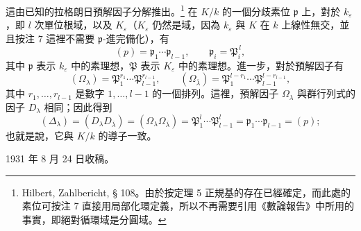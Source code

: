 \documentclass[11pt]{article}
\newcommand{\frakp}{\mathfrak p}
\newcommand{\frakP}{\mathfrak P}
\begin{document}
這由已知的拉格朗日預解因子分解推出。\footnote{Hilbert, Zahlbericht, § 108。由於按定理 5 正規基的存在已經確定，而此處的素位可按注 7 直接用局部化環定義，所以不再需要引用《數論報告》中所用的事實，即絕對循環域是分圓域。} 在 \(K/k\) 的一個分歧素位 \(\frakp\) 上，對於 \(k_\varepsilon\)，即 \(l\) 次單位根域，以及 \(K_\varepsilon\)（\(K_\varepsilon\) 仍然是域，因為 \(k_\varepsilon\) 與 \(K\) 在 \(k\) 上線性無交，並且按注 7 這裡不需要 \(\frakp\)-進完備化），有
\[
        (p)=\frakp_1\cdots\frakp_{l-1},
        \qquad
        \frakp_i=\frakP_i^{\,l},
\]
其中 \(\frakp\) 表示 \(k_\varepsilon\) 中的素理想，\(\frakP\) 表示 \(K_\varepsilon\) 中的素理想。進一步，對於預解因子有
\[
        (\Omega_\lambda)=\frakP_1^{r_1}\cdots\frakP_{l-1}^{r_{l-1}},
        \qquad
        (\Omega_{\bar\lambda})=
        \frakP_1^{l-r_1}\cdots\frakP_{l-1}^{l-r_{l-1}},
\]
其中 \(r_1,\ldots,r_{l-1}\) 是數字 \(1,\ldots,l-1\) 的一個排列。這裡，預解因子 \(\Omega_\lambda\) 與群行列式的因子 \(D_\lambda\) 相同；因此得到
\[
        (\Delta_\lambda)=(D_\lambda D_{\bar\lambda})
        =(\Omega_\lambda\Omega_{\bar\lambda})
        =\frakP_1^{l}\cdots\frakP_{l-1}^{l}
        =\frakp_1\cdots\frakp_{l-1}=(p);
\]
也就是說，它與 \(K/k\) 的導子一致。

\begin{center}
1931 年 8 月 24 日收稿。
\end{center}
\end{document}

